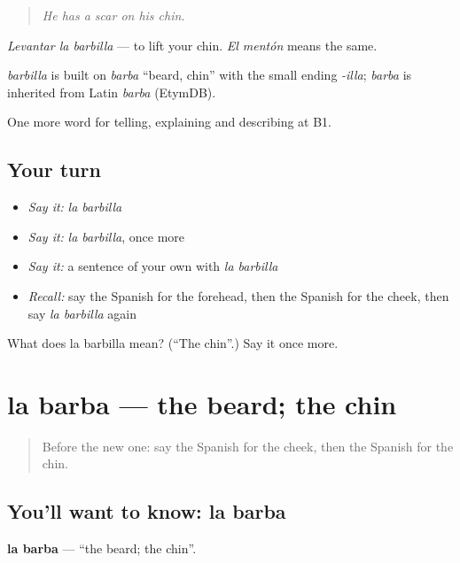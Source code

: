 \begin{quote}
\emph{He has a scar on his chin.}
\end{quote}

\emph{Levantar la barbilla} — to lift your chin. \emph{El mentón} means the same.

\begin{cousinweb}
\emph{barbilla} is built on \emph{barba} \textquotedblleft{}beard, chin\textquotedblright{} with the small ending \emph{-illa}; \emph{barba} is inherited from Latin \emph{barba} (EtymDB).
\end{cousinweb}

\begin{grammarlens}[title={What you've built}]
One more word for telling, explaining and describing at B1.
\end{grammarlens}

\subsection*{Your turn}
\begin{itemize}
\raggedright
  \item \emph{Say it:} \emph{la barbilla}
  \item \emph{Say it:} \emph{la barbilla}, once more
  \item \emph{Say it:} a sentence of your own with \emph{la barbilla}
  \item \emph{Recall:} say the Spanish for the forehead, then the Spanish for the cheek, then say \emph{la barbilla} again
\end{itemize}

\begin{tcolorbox}[breakable,colback=teal!4,colframe=teal!35!black,title={Before you move on}]
What does la barbilla mean? (\textquotedblleft{}The chin\textquotedblright{}.) Say it once more.
\end{tcolorbox}
\section[la barba]{la barba — the beard; the chin}

\label{lesson:ES-C736-barba}



\begin{quote}
Before the new one: say the Spanish for the cheek, then the Spanish for the chin.
\end{quote}

\subsection*{You'll want to know: la barba}
\textbf{la barba} — \textquotedblleft{}the beard; the chin\textquotedblright{}.

